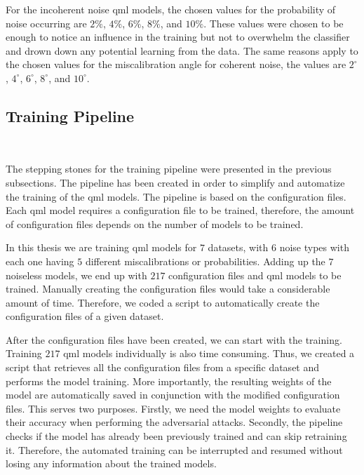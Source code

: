 For the incoherent noise \ac{qml} models, the chosen values for the
probability of noise occurring are \(2\%\), \(4\%\), \(6\%\), \(8\%\),
and \(10\%\). These values were chosen to be enough to notice an
influence in the training but not to overwhelm the classifier and
drown down any potential learning from the data. The same reasons
apply to the chosen values for the miscalibration angle for coherent
noise, the values are \(2^{\circ}\), \(4^{\circ}\), \(6^{\circ}\),
\(8^{\circ}\), and \(10^{\circ}\). \

\pagebreak

\subsection{Training Pipeline}\label{subsection:pipeline} \

The stepping stones for the training pipeline were presented
in the previous subsections. The pipeline has been created
in order to simplify and automatize the training of the
\ac{qml} models. The pipeline is based on the configuration
files. Each \ac{qml} model requires a configuration file to
be trained, therefore, the amount of configuration files
depends on the number of models to be trained. \

In this thesis we are training \ac{qml} models for \(7\)
datasets, with \(6\) noise types with each one having \(5\)
different miscalibrations or probabilities. Adding up
the \(7\) noiseless models, we end up with \(217\) configuration
files and \ac{qml} models to be trained. Manually creating
the configuration files would take a considerable
amount of time. Therefore, we coded a script to
automatically create the configuration files of a
given dataset. \

After the configuration files have been created,
we can start with the training. Training \(217\)
\ac{qml} models individually is also time consuming.
Thus, we created a script that retrieves all
the configuration files from a specific dataset
and performs the model training. More importantly,
the resulting weights of the model are automatically
saved in conjunction with the modified configuration
files. This serves two purposes. Firstly, we need the model
weights to evaluate their accuracy when performing the
adversarial attacks. Secondly, the pipeline checks
if the model has already been previously trained and
can skip retraining it. Therefore, the automated training
can be interrupted and resumed without losing any information
about the trained models. \

